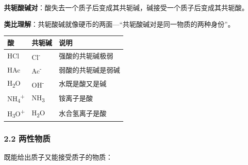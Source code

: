 \documentclass[a4paper,11pt]{ctexart}
\newcounter{none}
\begin{document}
\textbf{共轭酸碱对}：酸失去一个质子后变成其共轭碱，碱接受一个质子后变成其共轭酸。

\textbf{类比理解}：共轭酸碱就像硬币的两面---``共轭酸碱对是同一物质的两种身份''。

{\def\LTcaptype{none} %
\begin{longtable}[]{@{}lll@{}}
\toprule\noalign{}
酸 & 共轭碱 & 说明 \\
\midrule\noalign{}
\endhead
\bottomrule\noalign{}
\endlastfoot
HCl & Cl\textsuperscript{-} & 强酸的共轭碱极弱 \\
HAc & Ac\textsuperscript{-} & 弱酸的共轭碱是弱碱 \\
H\textsubscript{2}O & OH\textsuperscript{-} & 水既是酸又是碱 \\
NH\textsubscript{4}\textsuperscript{+} & NH\textsubscript{3} & 铵离子是酸 \\
H\textsubscript{3}O\textsuperscript{+} & H\textsubscript{2}O & 水合氢离子是酸 \\
\end{longtable}
}

\subsubsection{2.2 两性物质}\label{ux4e24ux6027ux7269ux8d28}

既能给出质子又能接受质子的物质：
\end{document}
